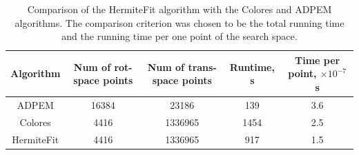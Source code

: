 \begin{table}[h]\small
\begin{centering}
\resizebox{\textwidth}{!} {
\begin{tabular}{|c|c|c|c|c|}
\hline
Algorithm & Num of rot-space points & Num of trans-space points & Runtime, s & Time per point, $\times 10^{-7}$s \\ \hline 
ADP\underline{\hspace*{0.2cm}}EM & 16384 & 23186 & 139 & 3.6 \\ \hline 
Colores & 4416 & 1336965 & 1454 & 2.5  \\ \hline 
HermiteFit & 4416 & 1336965 & 917 & 1.5  \\ \hline 
\end{tabular}
}
\medskip
\caption[Comparison of the HermiteFit algorithm with the Colores and ADP\underline{\hspace*{0.2cm}}EM algorithms by runtime]{ Comparison of the HermiteFit algorithm with the Colores and ADP\underline{\hspace*{0.2cm}}EM algorithms. The comparison criterion was chosen to be
the total running time and the running time per one point of the search space.}
\label{table:PerPointEffectiveness}
\par\end{centering}
\end{table}
